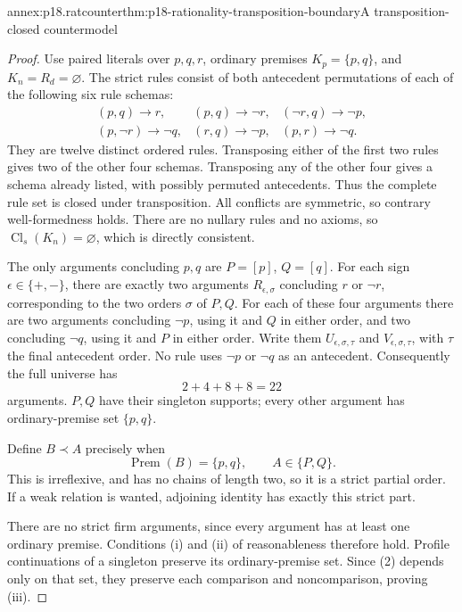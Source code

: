 \begin{annexitem}{annex:p18.ratcounter}{thm:p18-rationality-transposition-boundary}{A transposition-closed countermodel}
\begin{proof}
Use paired literals over \(p,q,r\), ordinary premises \(K_p=\{p,q\}\),
and \(K_n=R_d=\varnothing\). The strict rules consist of both antecedent
permutations of each of the following six rule schemas:
\[
\begin{array}{lll}
 (p,q)\to r,&(p,q)\to\neg r,&(\neg r,q)\to\neg p,\\
 (p,\neg r)\to\neg q,&(r,q)\to\neg p,&(p,r)\to\neg q .
\end{array}
\tag{1}
\]
They are twelve distinct ordered rules. Transposing either of the first
two rules gives two of the other four schemas. Transposing any of the
other four gives a schema already listed, with possibly permuted
antecedents. Thus the complete rule set is closed under transposition.
All conflicts are symmetric, so contrary well-formedness holds.
There are no nullary rules and no axioms, so
\(\operatorname{Cl}_s(K_n)=\varnothing\), which is directly consistent.

The only arguments concluding \(p,q\) are \(P=[p]\), \(Q=[q]\).
For each sign \(\epsilon\in\{+,-\}\), there are exactly two arguments
\(R_{\epsilon,\sigma}\) concluding \(r\) or \(\neg r\), corresponding
to the two orders \(\sigma\) of \(P,Q\).
For each of these four arguments there are two arguments concluding
\(\neg p\), using it and \(Q\) in either order, and two concluding
\(\neg q\), using it and \(P\) in either order. Write them
\(U_{\epsilon,\sigma,\tau}\) and
\(V_{\epsilon,\sigma,\tau}\), with \(\tau\) the final antecedent order.
No rule uses \(\neg p\) or \(\neg q\) as an antecedent.
Consequently the full universe has
\[
 2+4+8+8=22
\]
arguments. \(P,Q\) have their singleton supports; every other argument
has ordinary-premise set \(\{p,q\}\).

Define \(B\prec A\) precisely when
\[
 \operatorname{Prem}(B)=\{p,q\},
 \qquad A\in\{P,Q\}.
 \tag{2}
\]
This is irreflexive, and has no chains of length two, so it is a strict
partial order. If a weak relation is wanted, adjoining identity has
exactly this strict part.

There are no strict firm arguments, since every argument has at least
one ordinary premise. Conditions (i) and (ii) of reasonableness
therefore hold. Profile continuations of a singleton preserve its
ordinary-premise set. Since (2) depends only on that set, they preserve
each comparison and noncomparison, proving (iii).


\end{proof}
\end{annexitem}
